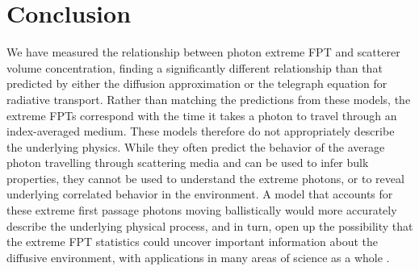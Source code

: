 \documentclass[9pt,twocolumn,twoside]{opticajnl}
\begin{document}
\section{Conclusion}
We have measured the relationship between photon extreme FPT and scatterer volume concentration, finding a significantly different relationship than that predicted by either the diffusion approximation or the telegraph equation for radiative transport. Rather than matching the predictions from these models, the extreme FPTs correspond with the time it takes a photon to travel through an index-averaged medium. These models therefore do not appropriately describe the underlying physics. While they often predict the behavior of the average photon travelling through scattering media and can be used to infer bulk properties, they cannot be used to understand the extreme photons, or to reveal underlying correlated behavior in the environment. A model that accounts for these extreme first passage photons moving ballistically would more accurately describe the underlying physical process, and in turn, open up the possibility that the extreme FPT statistics could uncover important information about the diffusive environment, with applications in many areas of science as a whole \cite{allgaier_diffuse_2021, collis_lidar_1966, loumaigne_intrinsic_2015, aleandri_dynamic_2018, taitelbaum_diagnosis_1999,das_non-fickian_1998,weiss_applications_2002,dudko_photon_2005}.






\end{document}
